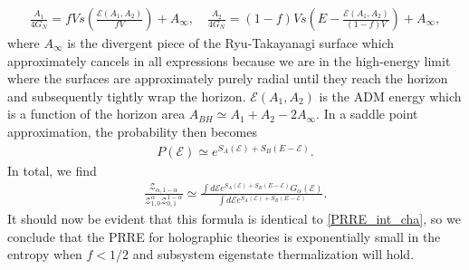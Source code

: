 \documentclass[a4paper,11pt]{article}
\begin{document}
\begin{align}
    \frac{A_1}{4G_N} = f Vs\left(\frac{\mathcal{E}(A_1, A_2)}{f V} \right) + A_{\infty},\quad \frac{A_2}{4G_N} = (1-f) Vs\left(E-\frac{\mathcal{E}(A_1, A_2)}{(1-f) V} \right)+ A_{\infty},
\end{align}
where $A_{\infty}$ is the divergent piece of the Ryu-Takayanagi surface which approximately cancels in all expressions because we are in the high-energy limit where the surfaces are approximately purely radial until they reach the horizon and subsequently tightly wrap the horizon. $\mathcal{E}(A_1, A_2)$ is the ADM energy which is a function of the horizon area $A_{BH} \simeq A_1 + A_2 -2 A_{\infty}$. In a saddle point approximation, the probability then becomes \cite{2020JHEP...11..007D}
\begin{align}
    P(\mathcal{E}) \simeq e^{S_A(\mathcal{E}) + S_{B}(E- \mathcal{E})}.
\end{align}
In total, we find 
\begin{align}
    \frac{\mathcal{Z}_{\alpha, 1-\alpha}}{\mathcal{Z}_{1,0}^{\alpha}\mathcal{Z}_{0,1}^{1-\alpha}} \simeq \frac{\int d\mathcal{E}  e^{S_A(\mathcal{E}) + S_{B}(E- \mathcal{E})} G_{\alpha}(\mathcal{E})}{\int d\mathcal{E}  e^{S_A(\mathcal{E}) + S_{B}(E- \mathcal{E})} }.
\end{align}
It should now be evident that this formula is identical to \eqref{PRRE_int_cha}, so we conclude that the PRRE for holographic theories is exponentially small in the entropy when $f < 1/2$ and subsystem eigenstate thermalization will hold.





\end{document}
